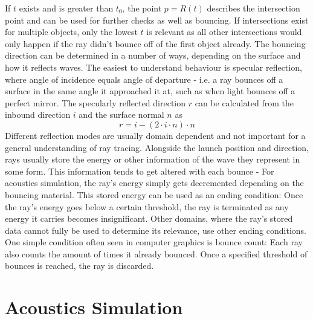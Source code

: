 If \(t\) exists and is greater than \(t_0\),
the point \(p = R(t)\) describes the intersection point and can be used for further checks
as well as bouncing.
If intersections exist for multiple objects,
only the lowest \(t\) is relevant as all other intersections would only happen if the ray didn't bounce off of the first object already.
\newline
The bouncing direction can be determined in a number of ways,
depending on the surface and how it reflects waves.
The easiest to understand behaviour is specular reflection,
where angle of incidence equals angle of departure -
i.e. a ray bounces off a surface in the same angle it approached it at,
such as when light bounces off a perfect mirror.
The specularly reflected direction \(r\) can be calculated from the inbound direction \(i\) and the surface normal \(n\) as
\begin{equation}\label{eq:SpecularReflection}
    r = i - (2 \cdot i \cdot n) \cdot n
\end{equation}
Different reflection modes are usually domain dependent
and not important for a general understanding of ray tracing.
\newline
Alongside the launch position and direction,
rays usually store the energy or other information of the wave they represent in some form.
This information tends to get altered with each bounce -
For acoustics simulation, the ray's energy simply gets decremented depending on the bouncing material.
\newline
This stored energy can be used as an ending condition:
Once the ray's energy goes below a certain threshold,
the ray is terminated as any energy it carries becomes insignificant.
Other domains, where the ray's stored data cannot fully be used to determine its relevance,
use other ending conditions.
One simple condition often seen in computer graphics is bounce count:
Each ray also counts the amount of times it already bounced.
Once a specified threshold of bounces is reached, the ray is discarded.

\section{Acoustics Simulation}\label{sec:FundamentalAcoustics}

